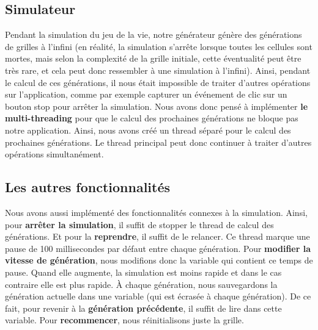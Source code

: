 \subsection{Simulateur}
Pendant la simulation du jeu de la vie, notre générateur génère des générations de grilles à l'infini (en réalité, la simulation s'arrête lorsque toutes les cellules sont mortes, mais selon la complexité de la grille initiale, cette éventualité peut être très rare, et cela peut donc ressembler à une simulation à l'infini). Ainsi, pendant le calcul de ces générations, il nous était impossible de traiter d'autres opérations sur l'application, comme par exemple capturer un événement de clic sur un bouton stop pour arrêter la simulation. Nous avons donc pensé à implémenter \textbf{le multi-threading} pour que le calcul des prochaines générations ne bloque pas notre application. Ainsi, nous avons créé un thread séparé pour le calcul des prochaines générations. Le thread principal peut donc continuer à traiter d'autres opérations simultanément.
\subsection{Les autres fonctionnalités}

Nous avons aussi implémenté des fonctionnalités connexes à la simulation. Ainsi, pour
\textbf{arrêter la simulation}, il suffit de stopper le thread de calcul des générations. Et pour la
\textbf{reprendre}, il suffit de le relancer. Ce thread marque une pause de 100 millisecondes par défaut
entre chaque génération. Pour \textbf{modifier la vitesse de génération}, nous modifions donc la
variable qui contient ce temps de pause. Quand elle augmente, la simulation est moins
rapide et dans le cas contraire elle est plus rapide. À chaque génération, nous
sauvegardons la génération actuelle dans une variable (qui est écrasée à chaque génération). De ce fait, pour revenir à la \textbf{génération précédente}, il suffit de lire dans cette variable.
Pour \textbf{recommencer}, nous réinitialisons juste la grille.




